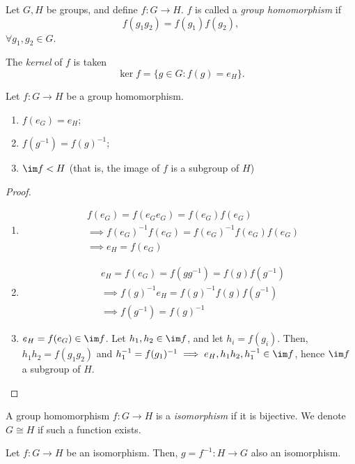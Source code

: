 \documentclass[12pt,oneside]{article}
\begin{document}
  \begin{definition}
    Let $G, H$ be groups, and define $f : G \to H$. $f$ is called a \emph{group homomorphism} if \[f(g_1 g_2) = f(g_1)f(g_2),\] $\forall g_1, g_2 \in G$.

    The \emph{kernel} of $f$ is taken \[
    \ker f = \{g \in G : f(g) = e_H\}.  
    \]
  \end{definition}

  \begin{lemma}
    Let $f : G \to H$ be a group homomorphism.
    \begin{enumerate}
      \item $f(e_G) = e_H$\footnotemark;
      \item $f(g^{-1}) = f(g)^{-1}$;
      \item $\im f < H$ (that is, the image of $f$ is a subgroup of $H$)
    \end{enumerate}
  \end{lemma}

  \begin{proof}
    \begin{enumerate}
      \item \begin{align*}
        &f(e_G) = f(e_G e_G) = f(e_G)f(e_G) \\
        &\implies f(e_G)^{-1} f(e_G) = f(e_G)^{-1} f(e_G)f(e_G) \\
        &\implies e_H = f(e_G)
      \end{align*}
      \item \begin{align*}
        &e_H = f(e_G) = f(g g^{-1}) = f(g)f(g^{-1}) \\
        &\implies f(g)^{-1}e_H = f(g)^{-1}f(g)f(g^{-1})\\
        &\implies f(g^{-1}) = f(g)^{-1}
      \end{align*}
      \item $e_H = f(e_G) \in \im f$. Let $h_1, h_2 \in \im f$, and let $h_i = f(g_i)$. Then, $h_1 h_2 = f(g_1 g_2)$ and $h_1^{-1} = f(g_1)^{-1} \implies e_H, h_1h_2, h_1^{-1} \in \im f$, hence $\im f$ a subgroup of $H$.
    \end{enumerate}
  \end{proof}

  \begin{definition}
    A group homomorphism $f: G \to H$ is a \emph{isomorphism} if it is bijective. We denote $G \cong H$ if such a function exists.
  \end{definition}
\begin{proposition}
  Let $f : G \to H$ be an isomorphism. Then, $g = f^{-1} : H \to G$ also an isomorphism. 
\end{proposition}
\end{document}
